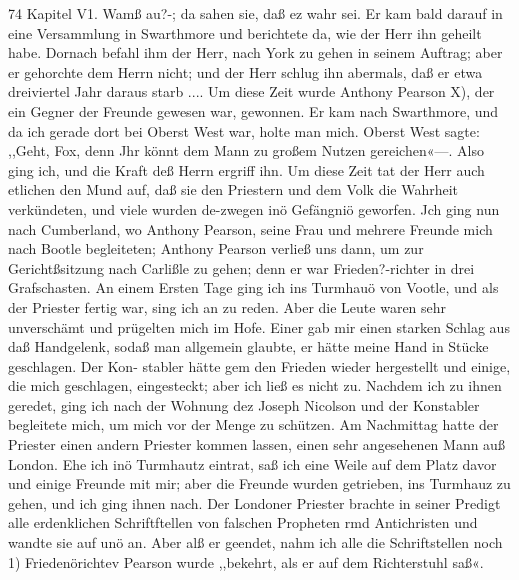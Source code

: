 74 Kapitel V1.
Wamß au?-; da sahen sie, daß ez wahr sei. Er kam bald darauf
in eine Versammlung in Swarthmore und berichtete da, wie
der Herr ihn geheilt habe. Dornach befahl ihm der Herr, nach
York zu gehen in seinem Auftrag; aber er gehorchte dem Herrn
nicht; und der Herr schlug ihn abermals, daß er etwa dreiviertel
Jahr daraus starb ....
Um diese Zeit wurde Anthony Pearson X), der ein Gegner der
Freunde gewesen war, gewonnen. Er kam nach Swarthmore,
und da ich gerade dort bei Oberst West war, holte man mich.
Oberst West sagte: ,,Geht, Fox, denn Jhr könnt dem Mann zu
großem Nutzen gereichen«—. Also ging ich, und die Kraft deß
Herrn ergriff ihn.
Um diese Zeit tat der Herr auch etlichen den Mund auf,
daß sie den Priestern und dem Volk die Wahrheit verkündeten,
und viele wurden de-zwegen inö Gefängniö geworfen. Jch ging
nun nach Cumberland, wo Anthony Pearson, seine Frau und
mehrere Freunde mich nach Bootle begleiteten; Anthony Pearson
verließ uns dann, um zur Gerichtßsitzung nach Carlißle zu gehen;
denn er war Frieden?-richter in drei Grafschasten. An einem
Ersten Tage ging ich ins Turmhauö von Vootle, und als der
Priester fertig war, sing ich an zu reden. Aber die Leute waren
sehr unverschämt und prügelten mich im Hofe. Einer gab mir
einen starken Schlag aus daß Handgelenk, sodaß man allgemein
glaubte, er hätte meine Hand in Stücke geschlagen. Der Kon-
stabler hätte gem den Frieden wieder hergestellt und einige, die
mich geschlagen, eingesteckt; aber ich ließ es nicht zu. Nachdem
ich zu ihnen geredet, ging ich nach der Wohnung dez Joseph
Nicolson und der Konstabler begleitete mich, um mich vor der
Menge zu schützen.
Am Nachmittag hatte der Priester einen andern Priester
kommen lassen, einen sehr angesehenen Mann auß London. Ehe
ich inö Turmhautz eintrat, saß ich eine Weile auf dem Platz davor
und einige Freunde mit mir; aber die Freunde wurden getrieben, ins
Turmhauz zu gehen, und ich ging ihnen nach. Der Londoner
Priester brachte in seiner Predigt alle erdenklichen Schriftftellen
von falschen Propheten rmd Antichristen und wandte sie auf unö
an. Aber alß er geendet, nahm ich alle die Schriftstellen noch
1) Friedenörichtev Pearson wurde ,,bekehrt, als er auf dem Richterstuhl saß«.


